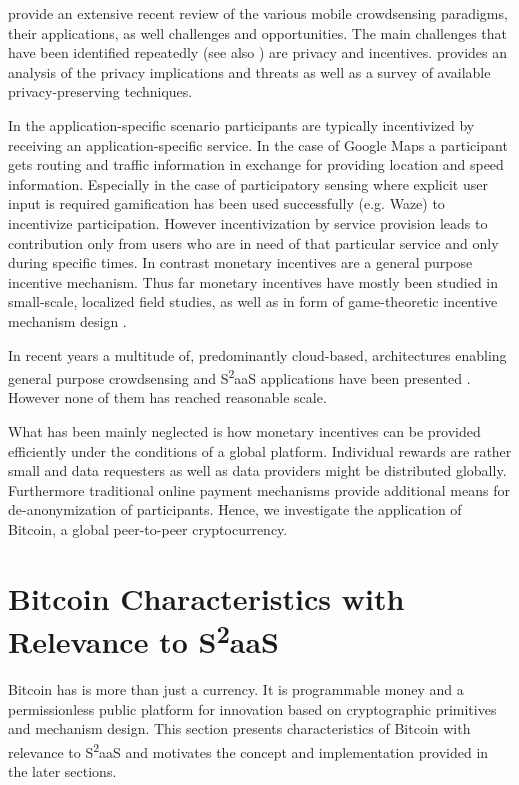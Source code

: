 \cite{guo2015mobile} provide an extensive recent review of the various mobile crowdsensing paradigms, their applications, as well challenges and opportunities. 
The main challenges that have been identified repeatedly (see also \parencite{he2015privacy}) are privacy and incentives. \parencite{Christin2015} provides an analysis of the privacy implications and threats as well as a survey of available privacy-preserving techniques. 

In the application-specific scenario participants are typically incentivized by receiving an application-specific service. In the case of Google Maps a participant gets routing and traffic information in exchange for providing location and speed information. Especially in the case of participatory sensing where explicit user input is required gamification \parencite{Deterding:2011:GDE:2181037.2181040} has been used successfully (e.g. Waze) to incentivize participation. However incentivization by service provision leads to contribution only from users who are in need of that particular service and only during specific times. In contrast monetary incentives are a general purpose incentive mechanism. Thus far monetary incentives have mostly been studied in small-scale, localized field studies, as well as in form of game-theoretic incentive mechanism design \parencite{7101300}. 

In recent years a multitude of, predominantly cloud-based, architectures enabling general purpose crowdsensing and S\textsuperscript{2}aaS applications have been presented \parencite{6558754,6525603,giannotti2012planetary,Haderer2015,merlino2016mobile}. However none of them has reached reasonable scale.

What has been mainly neglected is how monetary incentives can be provided efficiently under the conditions of a global platform. 
Individual rewards are rather small and data requesters as well as data providers might be distributed globally. Furthermore traditional online payment mechanisms provide additional means for de-anonymization of participants.
Hence, we investigate the application of Bitcoin, a global peer-to-peer cryptocurrency.

\section{Bitcoin Characteristics with Relevance to S\textsuperscript{2}aaS}
\label{sec:s2aas_charac}

Bitcoin has is more than just a currency. It is programmable money and a permissionless public platform for innovation based on cryptographic primitives and mechanism design. This section presents characteristics of Bitcoin with relevance to S\textsuperscript{2}aaS and motivates the concept and implementation provided in the later sections.

